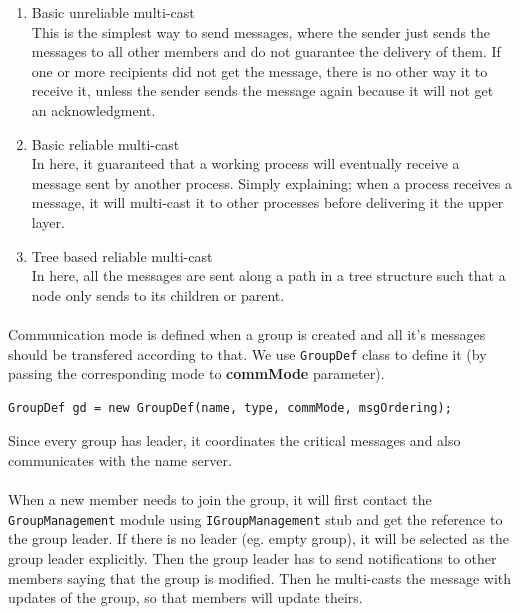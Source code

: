 \documentclass[a4paper,english,twoside]{article}
\begin{document}
\begin{enumerate}
\item Basic unreliable multi-cast\\
This is the simplest way to send messages, where the sender just sends the messages to all other members and do not guarantee the delivery of them. If one or more recipients did not get the message, there is no other way it to receive it, unless the sender sends the message again because it will not get an acknowledgment.

\item Basic reliable multi-cast\\
In here, it guaranteed that a working process will eventually receive a message sent by another process. Simply explaining; when a process receives a message, it will multi-cast it to other processes before delivering it the upper layer.

\item Tree based reliable multi-cast\\
In here, all the messages are sent along a path in a tree structure such that a node only sends to its children or parent.
\end{enumerate}

\paragraph{}
Communication mode is defined when a group is created and all it's messages should be transfered according to that. We use \texttt{GroupDef} class to define it (by passing the corresponding mode to \textbf{commMode} parameter).

{ \begin{lstlisting}
GroupDef gd = new GroupDef(name, type, commMode, msgOrdering);
\end{lstlisting}}

Since every group has leader, it coordinates the critical messages and also communicates with the name server.

\paragraph{}
When a new member needs to join the group, it will first contact the \texttt{GroupManagement} module using \texttt{IGroupManagement} stub and get the reference to the group leader. If there is no leader (eg. empty group), it will be selected as the group leader explicitly. Then the group leader has to send notifications to other members saying that the group is modified. Then he multi-casts the message with updates of the group, so that members will update theirs.
\end{document}
